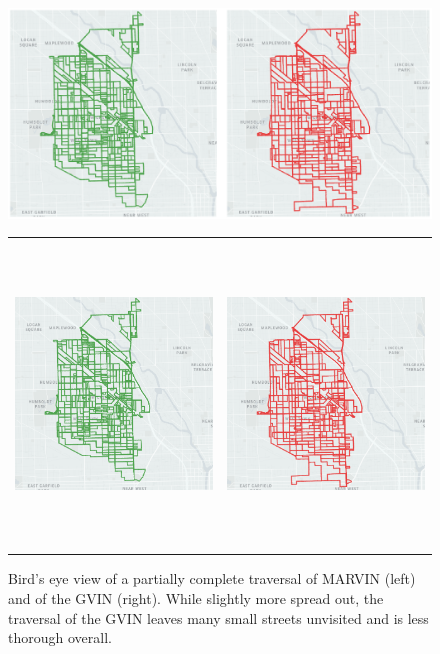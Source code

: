 \begin{figure}[t]
  \begin{center}
  \iflatexml
  \includegraphics[width=6\textwidth]{figs/vin_gvin_all.png}
  \else
    \begin{tabular}{ll}
      \includegraphics[height=8.1cm,trim={0.2cm 0 0.4cm 0},clip]{figs/vin_gvin_vin.png} &
      \includegraphics[height=8.1cm,trim={0.2cm 0 0.8cm 0},clip]{figs/vin_gvin_gvin.png} \\
    \end{tabular}
  \fi
  \caption{Bird's eye view of a partially complete traversal
  of MARVIN (left) and of the GVIN (right). While slightly more
  spread out, the traversal of the GVIN leaves many small streets
  unvisited and is less thorough overall.}
  \label{fig:vin_gvin}
  \end{center}
\end{figure}
